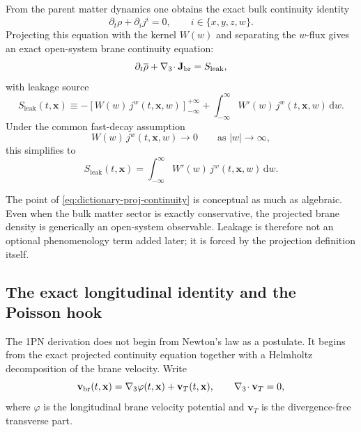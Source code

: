 \documentclass[11pt]{article}
\newcommand{\dd}{\mathrm d}
\newcommand{\x}{\mathbf x}
\newcommand{\gradThree}{\nabla_3}
\newcommand{\Wproj}{W}
\newcommand{\Proj}[1]{\overline{#1}}
\newcommand{\phibr}{\varphi}
\newcommand{\Sleak}{S_{\mathrm{leak}}}
\begin{document}
From the parent matter dynamics one obtains the exact bulk continuity identity
\begin{equation}
\partial_t \rho + \partial_i j^i = 0,
\qquad i\in\{x,y,z,w\}.
\label{eq:dictionary-bulk-continuity}
\end{equation}
Projecting this equation with the kernel \(\Wproj(w)\) and separating the \(w\)-flux gives
an exact open-system brane continuity equation:
\begin{equation}
\partial_t \Proj{\rho} + \gradThree\!\cdot \mathbf{J}_{\rm br}
=
\Sleak,
\label{eq:dictionary-proj-continuity}
\end{equation}
with leakage source
\begin{equation}
\Sleak(t,\x)
\equiv
-\left[\Wproj(w)\,j^w(t,\x,w)\right]_{-\infty}^{+\infty}
+
\int_{-\infty}^{\infty}\Wproj'(w)\,j^w(t,\x,w)\,\dd w.
\label{eq:dictionary-leakage}
\end{equation}
Under the common fast-decay assumption
\begin{equation}
\Wproj(w)\,j^w(t,\x,w)\to 0
\qquad\text{as }|w|\to\infty,
\label{eq:dictionary-fast-decay}
\end{equation}
this simplifies to
\begin{equation}
\Sleak(t,\x)
=
\int_{-\infty}^{\infty}\Wproj'(w)\,j^w(t,\x,w)\,\dd w.
\label{eq:dictionary-leakage-simplified}
\end{equation}

The point of \eqref{eq:dictionary-proj-continuity} is conceptual as much as algebraic.
Even when the bulk matter sector is exactly conservative, the projected brane density is
generically an open-system observable. Leakage is therefore not an optional phenomenology
term added later; it is forced by the projection definition itself.

\subsection{The exact longitudinal identity and the Poisson hook}
\label{sec:poisson-hook}

The 1PN derivation does not begin from Newton's law as a postulate. It begins from the
exact projected continuity equation together with a Helmholtz decomposition of the brane
velocity. Write
\begin{equation}
\mathbf{v}_{\rm br}(t,\x)
=
\gradThree \phibr(t,\x) + \mathbf{v}_T(t,\x),
\qquad
\gradThree\!\cdot\mathbf{v}_T = 0,
\label{eq:dictionary-helmholtz}
\end{equation}
where \(\phibr\) is the longitudinal brane velocity potential and \(\mathbf{v}_T\) is the
divergence-free transverse part.
\end{document}
